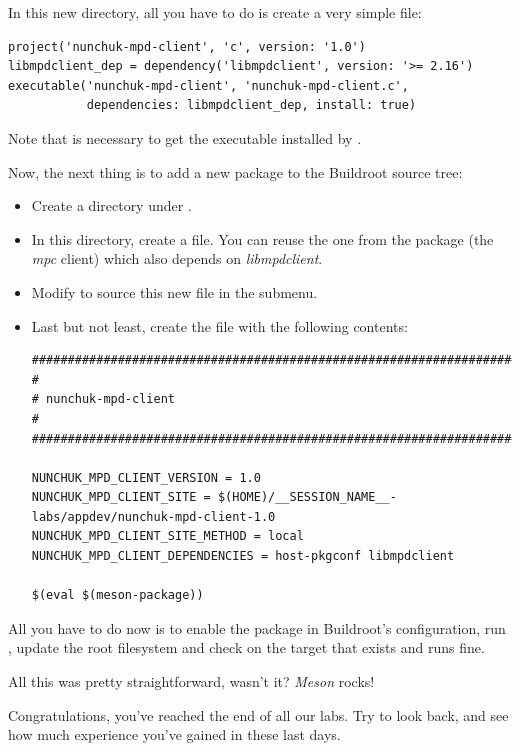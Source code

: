 In this new directory, all you have to do is create a very simple
 file:

\begin{verbatim}
project('nunchuk-mpd-client', 'c', version: '1.0')
libmpdclient_dep = dependency('libmpdclient', version: '>= 2.16')
executable('nunchuk-mpd-client', 'nunchuk-mpd-client.c',
           dependencies: libmpdclient_dep, install: true)
\end{verbatim}

Note that  is necessary to get the executable installed
by .

Now, the next thing is to add a new package to the Buildroot source
tree:
\begin{itemize}
\item Create a  directory under .
\item In this directory, create a  file. You can reuse
      the one from the  package (the {\em mpc} client)
      which also depends on {\em libmpdclient}.
\item Modify  to source this new file in the
       submenu.
\item Last but not least, create the  file
      with the following contents:
\begin{verbatim}
################################################################################
#
# nunchuk-mpd-client
#
################################################################################

NUNCHUK_MPD_CLIENT_VERSION = 1.0
NUNCHUK_MPD_CLIENT_SITE = $(HOME)/__SESSION_NAME__-labs/appdev/nunchuk-mpd-client-1.0
NUNCHUK_MPD_CLIENT_SITE_METHOD = local
NUNCHUK_MPD_CLIENT_DEPENDENCIES = host-pkgconf libmpdclient

$(eval $(meson-package))
\end{verbatim}
\end{itemize}

All you have to do now is to enable the 
package in Buildroot's configuration, run , update the root
filesystem and check on the target that
 exists and runs fine.

All this was pretty straightforward, wasn't it? {\em Meson} rocks!

Congratulations, you've reached the end of all our labs. Try to look
back, and see how much experience you've gained in these last days.
